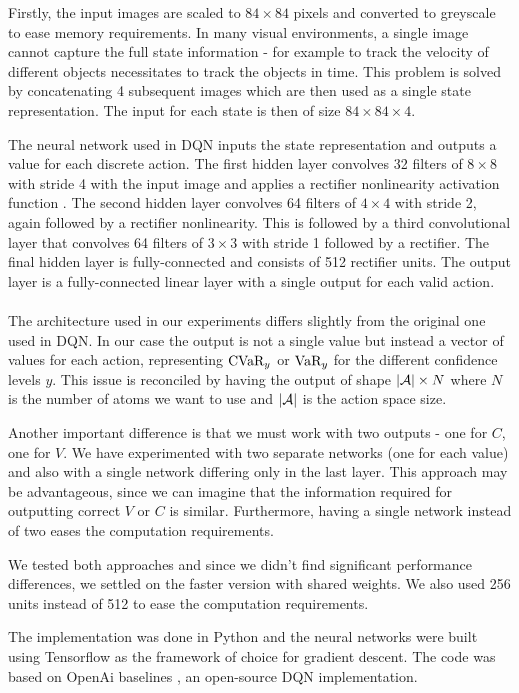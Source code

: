 Firstly, the input images are scaled to $84\times84$ pixels and converted to greyscale to ease memory requirements. In many visual environments, a single image cannot capture the full state information - for example to track the velocity of different objects necessitates to track the objects in time. This problem is solved by concatenating 4 subsequent images which are then used as a single state representation. The input for each state is then of size $84\times84\times4$.

The neural network used in DQN inputs the state representation and outputs a value for each discrete action. The first hidden layer convolves 32 filters of $8\times8$ with stride 4 with the input image and applies a rectifier nonlinearity activation function \citep{jarrett2009best}. The second hidden layer convolves 64 filters of $4\times4$ with stride 2, again followed by a rectifier nonlinearity. This is followed by a third convolutional layer that convolves 64 filters of $3\times3$ with stride 1 followed by a rectifier. The final hidden layer is fully-connected and consists of 512 rectifier units. The output layer is a fully-connected linear layer with a single output for each valid action.
\\
\\
The architecture used in our experiments differs slightly from the original one used in DQN. In our case the output is not a single value but instead a vector of values for each action, representing $\text{CVaR}_y$ or $\text{VaR}_y$ for the different confidence levels $y$. This issue is reconciled by having the output of shape $|\mathcal{A}|\times N$ where $N$ is the number of atoms we want to use and $|\mathcal{A}|$ is the action space size.

Another important difference is that we must work with two outputs - one for $C$, one for $V$. We have experimented with two separate networks (one for each value) and also with a single network differing only in the last layer. This approach may be advantageous, since we can imagine that the information required for outputting correct $V$ or $C$ is similar. Furthermore, having a single network instead of two eases the computation requirements.

We tested both approaches and since we didn't find significant performance differences, we settled on the faster version with shared weights. We also used 256 units instead of 512 to ease the computation requirements.

The implementation was done in Python and the neural networks were built using Tensorflow \citep{abadi2016tensorflow} as the framework of choice for gradient descent. The code was based on OpenAi baselines \citep{baselines}, an open-source DQN implementation.

